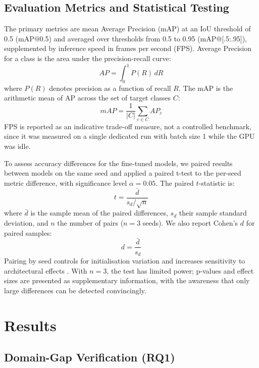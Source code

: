 \documentclass[conference]{IEEEtran}
\begin{document}
\subsection{Evaluation Metrics and Statistical Testing}

The primary metrics are mean Average Precision (mAP) at an IoU threshold of 0.5 (mAP@0.5) and averaged over thresholds from 0.5 to 0.95 (mAP@[.5:.95]), supplemented by inference speed in frames per second (FPS). Average Precision for a class is the area under the precision-recall curve:
\begin{equation}
AP = \int_{0}^{1} P(R) \, dR
\end{equation}
where $P(R)$ denotes precision as a function of recall $R$. The mAP is the arithmetic mean of AP across the set of target classes $C$:
\begin{equation}
mAP = \frac{1}{|C|} \sum_{c \in C} AP_c
\end{equation}
FPS is reported as an indicative trade-off measure, not a controlled benchmark, since it was measured on a single dedicated run with batch size 1 while the GPU was idle.

To assess accuracy differences for the fine-tuned models, we paired results between models on the same seed and applied a paired t-test to the per-seed metric difference, with significance level $\alpha = 0.05$. The paired $t$-statistic is:
\begin{equation}
t = \frac{\bar{d}}{s_d / \sqrt{n}}
\end{equation}
where $\bar{d}$ is the sample mean of the paired differences, $s_d$ their sample standard deviation, and $n$ the number of pairs ($n=3$ seeds). We also report Cohen's $d$ for paired samples:
\begin{equation}
d = \frac{\bar{d}}{s_d}
\end{equation}
Pairing by seed controls for initialisation variation and increases sensitivity to architectural effects \cite{ref_bouthillier}. With $n=3$, the test has limited power; p-values and effect sizes are presented as supplementary information, with the awareness that only large differences can be detected convincingly.

\section{Results}

\subsection{Domain-Gap Verification (RQ1)}
\end{document}
